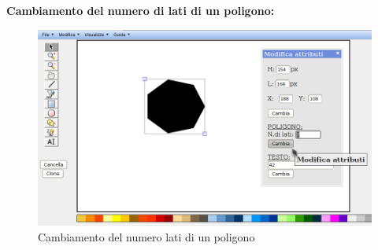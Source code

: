  
 
\textbf{Cambiamento del numero di lati di un poligono:}\\
\begin{figure}[!ht]
\centering
\includegraphics[scale=0.4]{images/numero_lati.png}
\caption{Cambiamento del numero lati di un poligono}
\end{figure}
 
 
